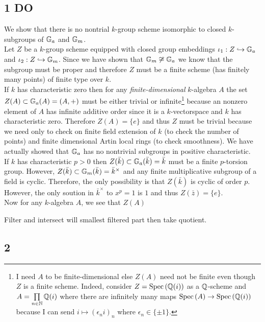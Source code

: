 \documentclass[12pt]{article}
\begin{document}
\subsection{1 DO}

We show that there is no nontrial $k$-group scheme isomorphic to closed $k$-subgroups of ${\mathbb{G}_a}$ and ${\mathbb{G}_m}$. 
\bigskip\\
Let $Z$ be a $k$-group scheme equipped with closed group embeddings $\iota_1 : Z \hookrightarrow {\mathbb{G}_a}$ and $\iota_2 : Z \hookrightarrow {\mathbb{G}_m}$. Since we have shown that ${\mathbb{G}_m} \not\cong {\mathbb{G}_a}$ we know that the subgroup must be proper and therefore $Z$ must be a finite scheme (has finitely many points) of finite type over $k$.
\bigskip\\
If $k$ has characteristic zero then for any \textit{finite-dimensional} $k$-algebra $A$ the set $Z(A) \subset {\mathbb{G}_a}(A) = (A, +)$ must be either trivial or infinite\footnote{I need $A$ to be finite-dimensional else $Z(A)$ need not be finite even though $Z$ is a finite scheme. Indeed, consider $Z = \mathrm{Spec}\left( \mathbb{Q}(i) \right)$ as a $\mathbb{Q}$-scheme and $A = \prod\limits_{n \in \mathbb{N}} \mathbb{Q}(i)$ where there are infinitely many maps $\mathrm{Spec}\left( A \right) \to \mathrm{Spec}\left( \mathbb{Q}(i) \right)$ because I can send $i \mapsto (\epsilon_n i)_n$ where $\epsilon_n \in \{ \pm 1 \}$.} because an nonzero element of $A$ has infinite additive order since it is a $k$-vectorspace and $k$ has characteristic zero. Therefore $Z(A) = \{ e \}$ and thus $Z$ must be trivial because we need only to check on finite field extension of $k$ (to check the number of points) and finite dimensional Artin local rings (to check smoothness). We have actually showed that ${\mathbb{G}_a}$ has no nontrivial subgroups in positive characteristic.
\bigskip\\
If $k$ has characteristic $p > 0$ then $Z(\bar{k}) \subset {\mathbb{G}_a}(\bar{k}) = \bar{k}$ must be a finite $p$-torsion group. However, $Z(\bar{k}) \subset {\mathbb{G}_m}(\bar{k}) = \bar{k}^\times$ and any finite multiplicative subgroup of a field is cyclic. Therefore, the only possibility is that  $Z(\bar{k})$ is cyclic of order $p$. However, the only soution in $\bar{k}^\times$ to $x^p = 1$ is $1$ and thus $Z(\bar{z}) = \{ e \}$.
\bigskip\\
Now for any $k$-algebra $A$, we see that $Z(A)$ 


Filter and intersect will smallest filtered part then take quotient.

\subsection{2}
\end{document}
